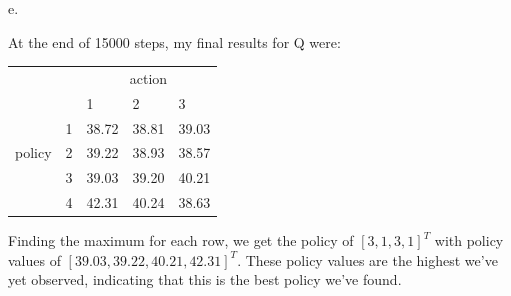 \documentclass{article}
\begin{document}
\noindent 
e. 

\noindent
At the end of 15000 steps, my final results for Q were:
\begin{table}[htb]
\begin{tabular}{lllll}
       &   & \multicolumn{3}{c}{action} \\
       &   & 1       & 2       & 3      \\
       & 1 & 38.72   & 38.81   & 39.03  \\
policy & 2 & 39.22   & 38.93   & 38.57  \\
       & 3 & 39.03   & 39.20   & 40.21  \\
       & 4 & 42.31   & 40.24   & 38.63 
\end{tabular}
\end{table}

\noindent 
Finding the maximum for each row, we get the policy of $[3,1,3,1]^T$ with policy values of $[39.03,39.22,40.21,42.31]^T$. These policy values are the highest we've yet observed, indicating that this is the best policy we've found.
\end{document}

